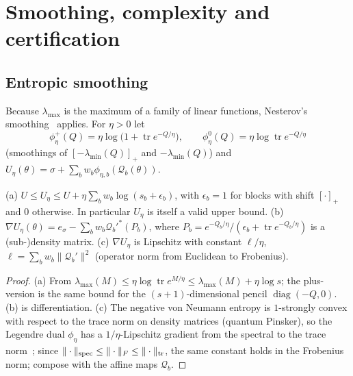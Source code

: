 \documentclass[a4paper,11pt]{article}
\theoremstyle{plain}
\theoremstyle{definition}
\theoremstyle{remark}
\newcommand{\diag}{\operatorname{diag}}
\newcommand{\tr}{\operatorname{tr}}
\newcommand{\lmin}{\lambda_{\min}}
\newcommand{\lmax}{\lambda_{\max}}
\newcommand{\pos}[1]{[#1]_+}
\begin{document}
\section{Smoothing, complexity and certification}\label{sec:algo}
\subsection{Entropic smoothing}
Because $\lmax$ is the maximum of a family of linear functions, Nesterov's smoothing~\cite{nesterov2005,nesterov2007} applies. For $\eta>0$ let
\[
\phi_\eta^{+}(Q)=\eta\log\Big(1+\tr e^{-Q/\eta}\Big),\qquad \phi_\eta^{0}(Q)=\eta\log\tr e^{-Q/\eta}
\]
(smoothings of $\pos{-\lmin(Q)}$ and $-\lmin(Q)$) and $U_\eta(\theta)=\sigma+\sum_bw_b\phi_{\eta,b}(\mathcal Q_b(\theta))$.
\begin{proposition}\label{prop:smooth}
(a) $U\le U_\eta\le U+\eta\sum_bw_b\log(s_b+\epsilon_b)$, with $\epsilon_b=1$ for blocks with shift $\pos{\cdot}$ and $0$ otherwise. In particular $U_\eta$ is itself a valid upper bound.
(b) $\nabla U_\eta(\theta)=e_\sigma-\sum_bw_b\mathcal Q_b'^{*}(P_b)$, where $P_b=e^{-Q_b/\eta}/(\epsilon_b+\tr e^{-Q_b/\eta})$ is a (sub-)density matrix.
(c) $\nabla U_\eta$ is Lipschitz with constant $\ell/\eta$, $\ell=\sum_bw_b\|\mathcal Q_b'\|^2$ (operator norm from Euclidean to Frobenius).
\end{proposition}
\begin{proof}
(a) From $\lmax(M)\le\eta\log\tr e^{M/\eta}\le\lmax(M)+\eta\log s$; the plus-version is the same bound for the $(s+1)$-dimensional pencil $\diag(-Q,0)$. (b) is differentiation. (c) The negative von Neumann entropy is $1$-strongly convex with respect to the trace norm on density matrices (quantum Pinsker), so the Legendre dual $\phi_\eta$ has a $1/\eta$-Lipschitz gradient from the spectral to the trace norm~\cite[Thm.~1]{nesterov2007}; since $\|\cdot\|_{\rm spec}\le\|\cdot\|_F\le\|\cdot\|_{\rm tr}$, the same constant holds in the Frobenius norm; compose with the affine maps $\mathcal Q_b$.
\end{proof}
\end{document}
